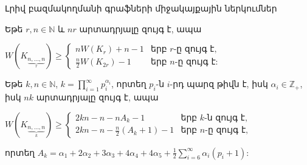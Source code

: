 \begin{frame}{Լրիվ բազմակողմանի գրաֆների միջակայքային ներկումներ}


\begin{theorem}[1.5.13]
Եթե $r,n\in \mathbb{N}$ և $nr$ արտադրյալը զույգ է, ապա
\begin{center}
$W\left(K_{\underbrace{\scriptstyle n,\ldots,n}_{r}}\right) \geq 
\left\{\begin{matrix}
 nW(K_r) + n -1 & \text{երբ }r\text{-ը զույգ է,} \\ 
 \frac{n}{2}W(K_{2r}) - 1 &  \text{երբ }n\text{-ը զույգ է:} 
\end{matrix}\right.$
\end{center}
\end{theorem}

\begin{hide}
\begin{corollary}
Եթե $k,n\in \mathbb{N}$, $k=\prod\limits_{i=1}^{\infty}{p_i^{\alpha_i}}$, որտեղ $p_i$-ն $i$-րդ պարզ թիվն է, իսկ $\alpha_i \in \mathbb{Z}_+$, իսկ $nk$ արտադրյալը զույգ է, ապա
\begin{center}
$W\left(K_{\underbrace{\scriptstyle n,\ldots,n}_{k}}\right) \geq 
\left\{\begin{matrix}
 2kn - n - nA_k - 1 & \text{երբ }k\text{-ն զույգ է,} \\ 
 2kn - n - \frac{n}{2}\left(A_k+1\right) - 1 &  \text{երբ }n\text{-ը զույգ է,} 
\end{matrix}\right.$
\end{center}
որտեղ $A_k = \alpha_1 + 2\alpha_2 + 3\alpha_3 + 4\alpha_4 + 4\alpha_5 + \frac{1}{2}\sum\limits_{i=6}^{\infty}{\alpha_i(p_i+1)}$:
\end{corollary}

\end{hide}
\end{frame}
